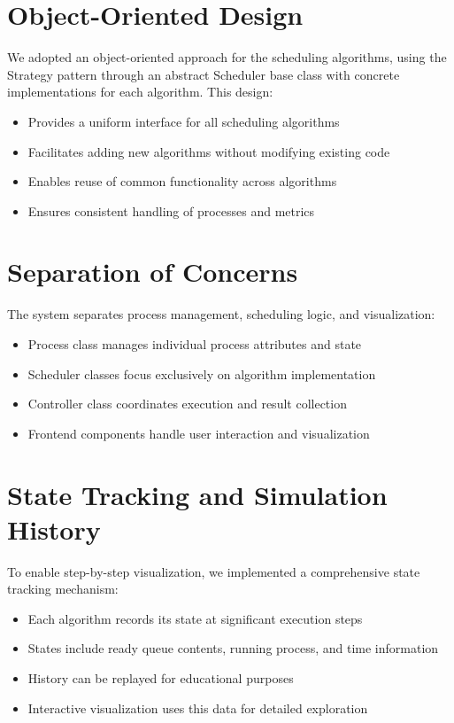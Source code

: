 \documentclass[12pt,a4paper]{report}
\begin{document}
\section{Object-Oriented Design}
We adopted an object-oriented approach for the scheduling algorithms, using the Strategy pattern through an abstract Scheduler base class with concrete implementations for each algorithm. This design:
\begin{itemize}
    \item Provides a uniform interface for all scheduling algorithms
    \item Facilitates adding new algorithms without modifying existing code
    \item Enables reuse of common functionality across algorithms
    \item Ensures consistent handling of processes and metrics
\end{itemize}

\section{Separation of Concerns}
The system separates process management, scheduling logic, and visualization:
\begin{itemize}
    \item Process class manages individual process attributes and state
    \item Scheduler classes focus exclusively on algorithm implementation
    \item Controller class coordinates execution and result collection
    \item Frontend components handle user interaction and visualization
\end{itemize}

\section{State Tracking and Simulation History}
To enable step-by-step visualization, we implemented a comprehensive state tracking mechanism:
\begin{itemize}
    \item Each algorithm records its state at significant execution steps
    \item States include ready queue contents, running process, and time information
    \item History can be replayed for educational purposes
    \item Interactive visualization uses this data for detailed exploration
\end{itemize}
\end{document}

